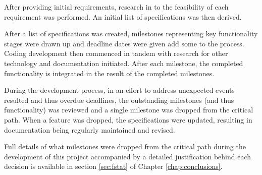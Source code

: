 After providing initial requirements, research in to the feasibility of
each requirement was performed. An initial list of specifications was
then derived.


After a list of specifications was created, milestones representing key
functionality stages were drawn up and deadline dates were given add
some to  the process. Coding development then commenced in tandem with 
research for other technology and documentation initiated. After each
milestone, the completed functionality is integrated in the result of
the completed milestones.


During the development process, in an effort to address unexpected 
events resulted and thus overdue deadlines, the outstanding milestones 
(and thus functionality) was reviewed and a single milestone was 
dropped from the critical path. When a feature was dropped, the 
specifications were updated, resulting in documentation being regularly 
maintained and revised.


Full details of what milestones were dropped from the critical path
during the development of this project accompanied by a detailed
justification behind each decision is available in 
section \ref{sec:fstat} of Chapter \ref{chap:conclusions}.
